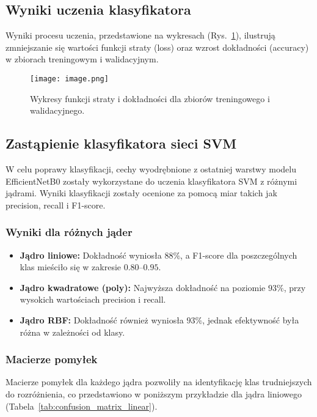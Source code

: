 \subsection{Wyniki uczenia klasyfikatora}
Wyniki procesu uczenia, przedstawione na wykresach (Rys.~\ref{fig:loss_accuracy}), ilustrują zmniejszanie się wartości funkcji straty (loss) oraz wzrost dokładności (accuracy) w zbiorach treningowym i walidacyjnym.

\begin{figure}[h!]
    \centering
    \texttt{[image: image.png]}
    \caption{Wykresy funkcji straty i dokładności dla zbiorów treningowego i walidacyjnego.}
    \label{fig:loss_accuracy}
\end{figure}

\subsection{Zastąpienie klasyfikatora sieci SVM}
W celu poprawy klasyfikacji, cechy wyodrębnione z ostatniej warstwy modelu EfficientNetB0 zostały wykorzystane do uczenia klasyfikatora SVM z różnymi jądrami. Wyniki klasyfikacji zostały ocenione za pomocą miar takich jak precision, recall i F1-score.

\subsubsection{Wyniki dla różnych jąder}
\begin{itemize}
    \item \textbf{Jądro liniowe:} Dokładność wyniosła $88\%$, a F1-score dla poszczególnych klas mieściło się w zakresie $0.80$--$0.95$. 
    \item \textbf{Jądro kwadratowe (poly):} Najwyższa dokładność na poziomie $93\%$, przy wysokich wartościach precision i recall.
    \item \textbf{Jądro RBF:} Dokładność również wyniosła $93\%$, jednak efektywność była różna w zależności od klasy.
\end{itemize}

\subsubsection{Macierze pomyłek}
Macierze pomyłek dla każdego jądra pozwoliły na identyfikację klas trudniejszych do rozróżnienia, co przedstawiono w poniższym przykładzie dla jądra liniowego (Tabela~\ref{tab:confusion_matrix_linear}).

